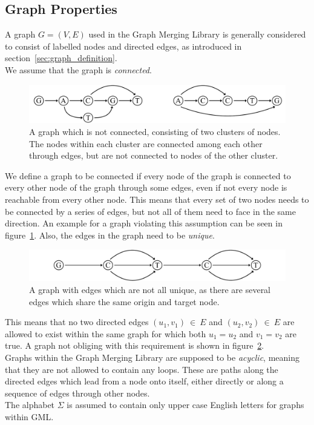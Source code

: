 \documentclass[a4paper,12pt,twoside,BCOR=10mm]{scrbook}
\begin{document}
\subsection{Graph Properties}

A graph $ G = (V, E) $ used in the Graph Merging Library is generally considered to consist of labelled nodes 
and directed edges, as introduced in section~\ref{sec:graph_definition}. \\
We assume that the graph is \textit{connected}. 
\begin{figure}[!htb]
\centering
\includegraphics[width=\textwidth]{evo_fig_assume_connectedness.pdf}
\caption[Graph which is not connected]{A graph which is not connected, consisting of two clusters of nodes. The nodes within each cluster are connected among each other through edges, but are not connected to nodes of the other cluster.} \label{fig:evo_fig_assume_connectedness}
\end{figure}
We define a graph to be connected if every node of the graph is connected to every other node of the graph through some edges, 
even if not every node is reachable from every other node. This means that every 
set of two nodes needs to be connected by a series of edges, but not all of them need to face in the same direction. 
An example for a graph violating this assumption can be seen in figure~\ref{fig:evo_fig_assume_connectedness}. 
Also, the edges in the graph need to be \textit{unique}. 
\begin{figure}[!htb]
\centering
\includegraphics[width=\textwidth]{evo_fig_assume_unique_edges.pdf}
\caption[Graph with edges which are not unique]{A graph with edges which are not all unique, as there are several edges which share the same origin and target node.} \label{fig:evo_fig_assume_unique_edges}
\end{figure}
This means that no two directed edges $ (u_1, v_1) {\: \in \:} E $ and $ (u_2, v_2) {\: \in \:} E $ are allowed to 
exist within the same graph for which both $ u_1 = u_2 $ and $ v_1 = v_2 $ are true. 
A graph not obliging with this requirement is shown in figure~\ref{fig:evo_fig_assume_unique_edges}. \\
Graphs within the Graph Merging Library are supposed to be \textit{acyclic}, 
meaning that they are not allowed to contain any loops. These are paths along 
the directed edges which lead from a node onto itself, either directly or along a sequence of edges through other nodes. \\
The alphabet $ \Sigma $ is assumed to contain only upper case English letters for graphs within GML.
\end{document}
